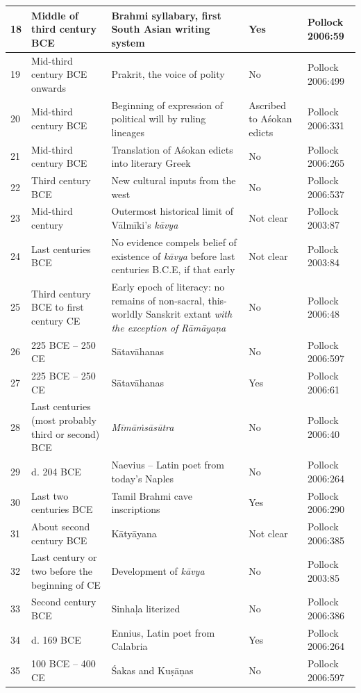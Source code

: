 \begin{longtable}{|l|p{1.9cm}|p{1.9cm}|p{1.6cm}|p{1.6cm}|}
\hline
18 & Middle of third century BCE & Brahmi syllabary, first South Asian writing system & Yes & Pollock 2006:59 \\
\hline
19 & Mid-third century BCE onwards & Prakrit, the voice of polity & No & Pollock 2006:499 \\
\hline
20 & Mid-third century BCE & Beginning of expression of political will by ruling lineages & Ascribed to Aśokan edicts & Pollock 2006:331 \\
\hline
21 & Mid-third century BCE & Translation of Aśokan edicts into literary Greek & No & Pollock 2006:265 \\
\hline
22 & Third century BCE & New cultural inputs from the west & No & Pollock 2006:537 \\
\hline
23 & Mid-third century & Outermost historical limit of Vālmīki’s \textit{kāvya} & Not clear & Pollock 2003:87 \\
\hline
24 & Last centuries BCE & No evidence compels belief of existence of \textit{kāvya} before last centuries B.C.E, if that early & Not clear & Pollock 2003:84 \\
\hline
25 & Third century BCE to first century CE & Early epoch of literacy: no remains of non-sacral, this-worldly Sanskrit extant \textit{with the exception of} \textit{Rāmāyaṇa} & No & Pollock 2006:48 \\
\hline
26 & 225 BCE – 250 CE & Sātavāhanas & No & Pollock 2006:597 \\
\hline
27 & 225 BCE – 250 CE & Sātavāhanas & Yes & Pollock 2006:61 \\
\hline
28 & Last centuries (most probably third or second) BCE & \textit{Mīmāṁsāsūtra} & No & Pollock 2006:40 \\
\hline
29 & d. 204 BCE & Naevius – Latin poet from today’s Naples & No & Pollock 2006:264 \\
\hline
30 & Last two centuries BCE & Tamil Brahmi cave inscriptions & Yes & Pollock 2006:290 \\
\hline
31 & About second century BCE & Kātyāyana & Not clear & Pollock 2006:385 \\
\hline
32 & Last century or two before the beginning of CE & Development of \textit{kāvya} & No & Pollock 2003:85 \\
\hline
33 & Second century BCE & Sinhaḷa literized & No & Pollock 2006:386 \\
\hline
34 & d. 169 BCE & Ennius, Latin poet from Calabria & Yes & Pollock 2006:264 \\
\hline
35 & 100 BCE – 400 CE & Śakas and Kuṣāṇas & No & Pollock 2006:597 \\

\end{longtable}
